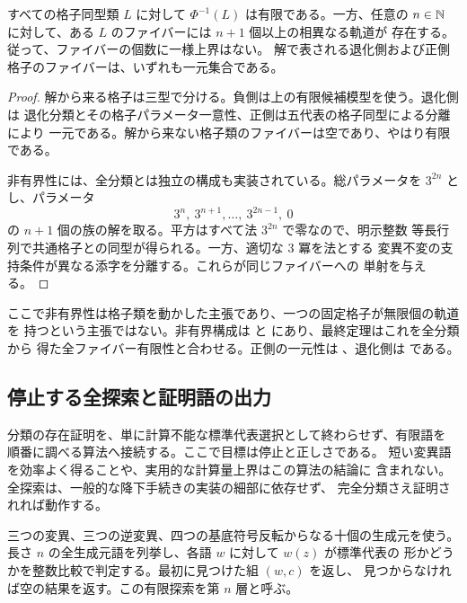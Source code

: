 \begin{theorem}[各ファイバーの有限性と一様非有界性]
\label{bp:full-finite-unbounded}
\leanok
{}
すべての格子同型類 $L$ に対して $\Phi^{-1}(L)$ は有限である。一方、任意の
$n\in\mathbb N$ に対して、ある $L$ のファイバーには $n+1$ 個以上の相異なる軌道が
存在する。従って、ファイバーの個数に一様上界はない。
解で表される退化側および正側格子のファイバーは、いずれも一元集合である。
\end{theorem}
\begin{proof}
\leanok
解から来る格子は三型で分ける。負側は上の有限候補模型を使う。退化側は
退化分類とその格子パラメータ一意性、正側は五代表の格子同型による分離により
一元である。解から来ない格子類のファイバーは空であり、やはり有限である。

非有界性には、全分類とは独立の構成も実装されている。総パラメータを
$3^{2n}$ とし、パラメータ
\[
 3^n,\ 3^{n+1},\ldots,\ 3^{2n-1},\ 0
\]
の $n+1$ 個の族の解を取る。平方はすべて法 $3^{2n}$ で零なので、明示整数
等長行列で共通格子との同型が得られる。一方、適切な $3$ 冪を法とする
変異不変の支持条件が異なる添字を分離する。これらが同じファイバーへの
単射を与える。
\end{proof}

ここで非有界性は格子類を動かした主張であり、一つの固定格子が無限個の軌道を
持つという主張ではない。非有界構成は  と
 にあり、最終定理はこれを全分類から
得た全ファイバー有限性と合わせる。正側の一元性は
、退化側は
 である。

\subsection{停止する全探索と証明語の出力}

分類の存在証明を、単に計算不能な標準代表選択として終わらせず、有限語を
順番に調べる算法へ接続する。ここで目標は停止と正しさである。
短い変異語を効率よく得ることや、実用的な計算量上界はこの算法の結論に
含まれない。全探索は、一般的な降下手続きの実装の細部に依存せず、
完全分類さえ証明されれば動作する。

\begin{definition}[長さごとの語探索]
\label{bp:alg-search}
\leanok
{}
三つの変異、三つの逆変異、四つの基底符号反転からなる十個の生成元を使う。
長さ $n$ の全生成元語を列挙し、各語 $w$ に対して $w(z)$ が標準代表の
形かどうかを整数比較で判定する。最初に見つけた組 $(w,c)$ を返し、
見つからなければ空の結果を返す。この有限探索を第 $n$ 層と呼ぶ。
\end{definition}

